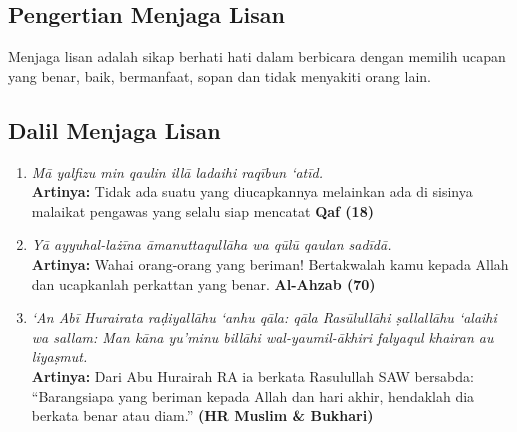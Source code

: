 \subsection{Pengertian Menjaga Lisan}
Menjaga lisan adalah sikap berhati hati dalam berbicara dengan memilih ucapan yang benar, baik, bermanfaat, sopan dan tidak menyakiti orang lain.

\subsection{Dalil Menjaga Lisan}
\begin{enumerate}
\item \textit{Mā yalfizu min qaulin illā ladaihi raqībun ‘atīd.} \\
  \textbf{Artinya: }Tidak ada suatu yang diucapkannya melainkan ada di sisinya malaikat pengawas yang selalu siap mencatat \textbf{Qaf (18)}

\item \textit{Yā ayyuhal-lażīna āmanuttaqullāha wa qūlū qaulan sadīdā.} \\
  \textbf{Artinya: }Wahai orang-orang yang beriman! Bertakwalah kamu kepada Allah dan ucapkanlah perkattan yang benar. \textbf{Al-Ahzab (70)}

\item \textit{‘An Abī Hurairata raḍiyallāhu ‘anhu qāla: qāla Rasūlullāhi ṣallallāhu ‘alaihi wa sallam: Man kāna yu’minu billāhi wal-yaumil-ākhiri falyaqul khairan au liyaṣmut.} \\
  \textbf{Artinya: }Dari Abu Hurairah RA ia berkata Rasulullah SAW bersabda: ``Barangsiapa yang beriman kepada Allah dan hari akhir, hendaklah dia berkata benar atau diam.'' \textbf{(HR Muslim \& Bukhari)}
\end{enumerate}

